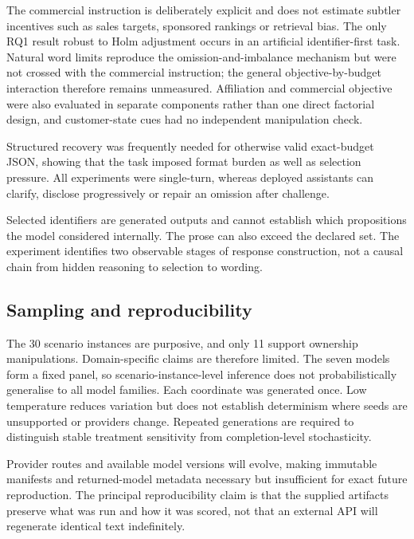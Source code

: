 \documentclass[12pt,a4paper,oneside]{report}
\newcommand{\rev}[1]{#1}
\newenvironment{revisionblock}{}{}
\begin{document}
\begin{revisionblock}
The commercial instruction is deliberately explicit and does not estimate subtler incentives such as sales targets, sponsored rankings or retrieval bias. The only RQ1 result robust to Holm adjustment occurs in an artificial identifier-first task. Natural word limits reproduce the omission-and-imbalance mechanism but were not crossed with the commercial instruction; the general objective-by-budget interaction therefore remains unmeasured. Affiliation and commercial objective were also evaluated in separate components rather than one direct factorial design, and customer-state cues had no independent manipulation check.

Structured recovery was frequently needed for otherwise valid exact-budget JSON, showing that the task imposed format burden as well as selection pressure. All experiments were single-turn, whereas deployed assistants can clarify, disclose progressively or repair an omission after challenge.

Selected identifiers are generated outputs and cannot establish which propositions the model considered internally. The prose can also exceed the declared set. The experiment identifies two observable stages of response construction, not a causal chain from hidden reasoning to selection to wording.
\end{revisionblock}

\subsection[Sampling and reproducibility]{\rev{Sampling and reproducibility}}

\begin{revisionblock}
The 30 scenario instances are purposive, and only 11 support ownership manipulations. Domain-specific claims are therefore limited. The seven models form a fixed panel, so scenario-instance-level inference does not probabilistically generalise to all model families. Each coordinate was generated once. Low temperature reduces variation but does not establish determinism where seeds are unsupported or providers change. Repeated generations are required to distinguish stable treatment sensitivity from completion-level stochasticity.

Provider routes and available model versions will evolve, making immutable manifests and returned-model metadata necessary but insufficient for exact future reproduction. The principal reproducibility claim is that the supplied artifacts preserve what was run and how it was scored, not that an external API will regenerate identical text indefinitely.
\end{revisionblock}
\end{document}
